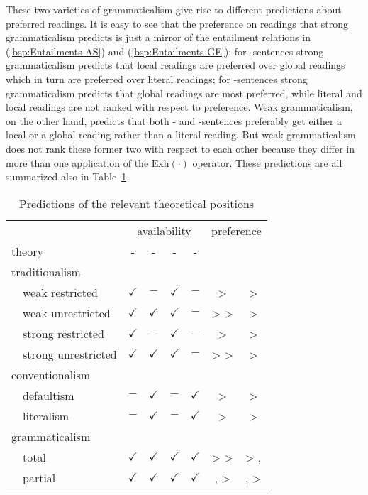 \documentclass[fleqn,reqno,10pt,draft]{article}
\newcommand{\lit}{\acro{lit}}
\newcommand{\glb}{\acro{glb}}
\newcommand{\loc}{\acro{loc}}
\newcommand{\as}{\acro{as}}
\renewcommand{\es}{\acro{es}}
\newcommand{\exh}{\ensuremath{\mathrm{Exh}}}
\begin{document}
These two varieties of grammaticalism give rise to different
predictions about preferred readings. It is easy to see that the
preference on readings that strong grammaticalism predicts is just a
mirror of the entailment relations in (\ref{bsp:Entailments-AS}) and
(\ref{bsp:Entailments-GE}): for \as-sentences strong grammaticalism
predicts that local readings are preferred over global readings which
in turn are preferred over literal readings; for \es-sentences strong
grammaticalism predicts that global readings are most preferred, while
literal and local readings are not ranked with respect to
preference. Weak grammaticalism, on the other hand, predicts that both
\as- and \es-sentences preferably get either a local or a global
reading rather than a literal reading. But weak grammaticalism does
not rank these former two with respect to each other because they
differ in more than one application of the $\exh(\cdot)$
operator. These predictions are all summarized also in
Table~\ref{tab:predictions}.

\begin{table}[t]
  \centering
  \begin{tabular}{lcccccc}
    & \multicolumn{4}{c}{availability} 
    & \multicolumn{2}{c}{preference}
    \\ \cmidrule(r){2-5}  \cmidrule(r){6-7}
    theory
    & \as-\glb
    & \as-\loc
    & \es-\glb
    & \es-\loc
    & \as
    & \es
    \\ \midrule
    traditionalism
    \\
    \ \ weak restricted 
    & $\checkmark$
    & $-$
    & $\checkmark$
    & $-$
    & \lit > \glb 
    & \lit > \glb
    \\
    \ \ weak unrestricted
    & $\checkmark$
    & $\checkmark$
    & $\checkmark$
    & $-$
    & \lit > \glb > \loc 
    & \lit > \glb
    \\
    \ \ strong restricted
    & $\checkmark$
    & $-$
    & $\checkmark$
    & $-$
    & \glb > \lit 
    & \glb > \lit
    \\
    \ \ strong unrestricted
    & $\checkmark$
    & $\checkmark$
    & $\checkmark$
    & $-$
    & \glb > \loc > \lit 
    & \glb > \lit
    \\
    conventionalism
    \\
    \ \ defaultism
    & $-$
    & $\checkmark$
    & $-$
    & $\checkmark$
    & \loc >  \lit 
    & \loc >  \lit
    \\
    \ \ literalism
    & $-$
    & $\checkmark$
    & $-$
    & $\checkmark$
    & \lit >  \loc 
    & \lit >  \loc
    \\
    grammaticalism
    \\
    \ \ total
    & $\checkmark$
    & $\checkmark$
    & $\checkmark$
    & $\checkmark$
    & \loc > \glb > \lit 
    & \glb > \lit, \loc
    \\
    \ \ partial
    & $\checkmark$
    & $\checkmark$
    & $\checkmark$
    & $\checkmark$
    & \glb, \loc > \lit 
    & \glb, \loc >  \lit
    \\
  \end{tabular}
  \caption{Predictions of the relevant theoretical positions}
  \label{tab:predictions}
\end{table}
\end{document}
